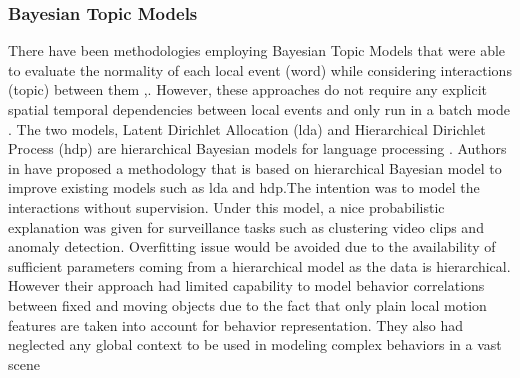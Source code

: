 \documentclass[a4paper,12pt]{report}
\begin{document}
\begin{itemize}
\subsubsection{Bayesian Topic Models}

There have been methodologies employing Bayesian Topic Models that were able to evaluate the normality of each local event (word) while considering interactions (topic) between them \cite{105},\cite{106}. However, these approaches do not require any explicit spatial temporal dependencies between local events and only run in a batch mode \cite{107}. The two models, Latent Dirichlet Allocation (\gls{lda}) and Hierarchical Dirichlet Process (\gls{hdp}) are hierarchical Bayesian models for language processing \cite{105}. Authors in \cite{105} have proposed a methodology that is based on hierarchical Bayesian model to improve existing models such as \gls{lda} and \gls{hdp}.The intention was to model the interactions without supervision. Under this model, a nice probabilistic explanation was given for surveillance tasks such as clustering video clips and anomaly detection. Overfitting issue would be avoided due to the availability of sufficient parameters coming from a hierarchical model as the data is hierarchical. However their approach had limited capability to model behavior correlations between fixed and moving objects due to the fact that only plain local motion features are taken into account for behavior representation. They also had neglected any global context to be used in modeling complex behaviors in a vast scene \cite{106}


\end{itemize}
\end{document}
